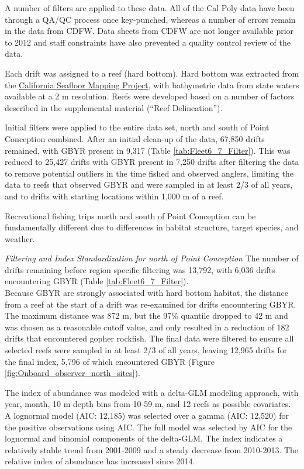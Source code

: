\documentclass[12pt,]{article}
\begin{document}
A number of filters are applied to these data. All of the Cal Poly data
have been through a QA/QC process once key-punched, whereas a number of
errors remain in the data from CDFW. Data sheets from CDFW are not
longer available prior to 2012 and staff constraints have also prevented
a quality control review of the data.

Each drift was assigned to a reef (hard bottom). Hard bottom was
extracted from the
\href{http://seafloor.otterlabs.org/index.html}{California Seafloor
Mapping Project}, with bathymetric data from state waters available at a
2 m resolution. Reefs were developed based on a number of factors
described in the supplemental material (``Reef Delineation'').

Initial filters were applied to the entire data set, north and south of
Point Conception combined. After an initial clean-up of the data, 67,850
drifts remained, with GBYR present in 9,317 (Table
\ref{tab:Fleet6_7_Filter}). This was reduced to 25,427 drifts with GBYR
present in 7,250 drifts after filtering the data to remove potential
outliers in the time fished and observed anglers, limiting the data to
reefs that observed GBYR and were sampled in at least 2/3 of all years,
and to drifts with starting locations within 1,000 m of a reef.

Recreational fishing trips north and south of Point Conception can be
fundamentally different due to differences in habitat structure, target
species, and weather.

\emph{Filtering and Index Standardization for north of Point Conception}
The number of drifts remaining before region specific filtering was
13,792, with 6,036 drifts encountering GBYR (Table
\ref{tab:Fleet6_7_Filter}).\\
Because GBYR are strongly associated with hard bottom habitat, the
distance from a reef at the start of a drift was re-examined for drifts
encountering GBYR. The maximum distance was 872 m, but the 97\% quantile
dropped to 42 m and was chosen as a reasonable cutoff value, and only
resulted in a reduction of 182 drifts that encountered gopher rockfish.
The final data were filtered to ensure all selected reefs were sampled
in at least 2/3 of all years, leaving 12,965 drifts for the final index,
5,796 of which encountered GBYR (Figure
\ref{fig:Onboard_observer_north_sites}).

The index of abundance was modeled with a delta-GLM modeling approach,
with year, month, 10 m depth bins from 10-59 m, and 12 reefs as possible
covariates. A lognormal model (AIC: 12,185) was selected over a gamma
(AIC: 12,520) for the positive observations using AIC. The full model
was selected by AIC for the lognormal and binomial components of the
delta-GLM. The index indicates a relatively stable trend from 2001-2009
and a steady decrease from 2010-2013. The relative index of abundance
has increased since 2014.
\end{document}
